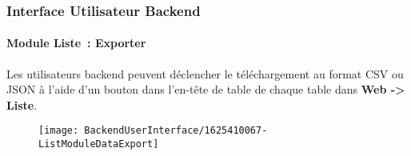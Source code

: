 %

\begin{frame}[fragile]
	\frametitle{Interface Utilisateur Backend}
	\framesubtitle{Module Liste~: Exporter}

	Les utilisateurs backend peuvent déclencher le téléchargement au format CSV ou JSON
	à l'aide d'un bouton dans l'en-tête de table de chaque table dans \textbf{Web -> Liste}.

	\begin{figure}
		\texttt{[image: BackendUserInterface/1625410067-ListModuleDataExport]}
	\end{figure}

\end{frame}

